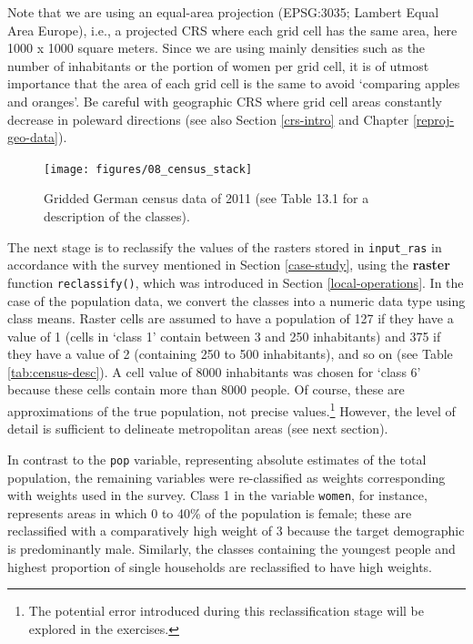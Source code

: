 \documentclass[]{krantz}
\let\rmarkdownfootnote\footnote%
\def\footnote{\protect\rmarkdownfootnote}
\let\BeginKnitrBlock\begin \let\EndKnitrBlock\end
\begin{document}
\BeginKnitrBlock{rmdnote}
Note that we are using an equal-area projection (EPSG:3035; Lambert Equal Area Europe), i.e., a projected CRS where each grid cell has the same area, here 1000 x 1000 square meters.
Since we are using mainly densities such as the number of inhabitants or the portion of women per grid cell, it is of utmost importance that the area of each grid cell is the same to avoid `comparing apples and oranges'.
Be careful with geographic CRS where grid cell areas constantly decrease in poleward directions (see also Section \ref{crs-intro} and Chapter \ref{reproj-geo-data}).
\EndKnitrBlock{rmdnote}

\begin{figure}[t]

{\centering \texttt{[image: figures/08\_census\_stack]} 

}

\caption[Gridded German census data.]{Gridded German census data of 2011 (see Table 13.1 for a description of the classes).}\label{fig:census-stack}
\end{figure}

The next stage is to reclassify the values of the rasters stored in \texttt{input\_ras} in accordance with the survey mentioned in Section \ref{case-study}, using the \textbf{raster} function \texttt{reclassify()}, which was introduced in Section \ref{local-operations}.
In the case of the population data, we convert the classes into a numeric data type using class means.
Raster cells are assumed to have a population of 127 if they have a value of 1 (cells in `class 1' contain between 3 and 250 inhabitants) and 375 if they have a value of 2 (containing 250 to 500 inhabitants), and so on (see Table \ref{tab:census-desc}).
A cell value of 8000 inhabitants was chosen for `class 6' because these cells contain more than 8000 people.
Of course, these are approximations of the true population, not precise values.\footnote{The potential error introduced during this reclassification stage will be explored in the exercises.}
However, the level of detail is sufficient to delineate metropolitan areas (see next section).

In contrast to the \texttt{pop} variable, representing absolute estimates of the total population, the remaining variables were re-classified as weights corresponding with weights used in the survey.
Class 1 in the variable \texttt{women}, for instance, represents areas in which 0 to 40\% of the population is female;
these are reclassified with a comparatively high weight of 3 because the target demographic is predominantly male.
Similarly, the classes containing the youngest people and highest proportion of single households are reclassified to have high weights.
\end{document}
